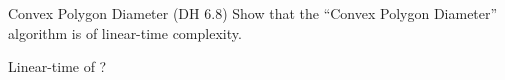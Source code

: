 
\begin{frame}{}
  \begin{exampleblock}{Convex Polygon Diameter (DH $6.8$)}
    Show that the ``Convex Polygon Diameter'' algorithm is of linear-time complexity.
  \end{exampleblock}

  \pause
  \vspace{0.40\textwidth}
  \centerline{Linear-time of ?}
\end{frame}

\begin{frame}{}
  \centerline{}
\end{frame}

\begin{frame}{}
  \centerline{}

  \pause
  \vspace{0.60cm}
  \begin{alertblock}
  \end{alertblock}
\end{frame}

\begin{frame}{}
  \centerline{}

  \begin{definition}
  \end{definition}

  \pause
  \vspace{0.60cm}
  \begin{definition}[Antipodal]
  \end{definition}
\end{frame}

\begin{frame}{}
  \centerline{}

  \begin{theorem}[]
  \end{theorem}
\end{frame}

